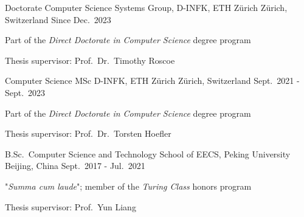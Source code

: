 

\begin{cventries}

  \cventry
    {Doctorate Computer Science} %
    {Systems Group, D-INFK, ETH Zürich} %
    {Zürich, Switzerland} %
    {Since Dec.\ 2023} %
    {
      \begin{cvitems} %
      \item {Part of the \emph{Direct Doctorate in Computer Science} degree program}
      \item {Thesis supervisor: Prof.\ Dr.\ Timothy Roscoe}
      \end{cvitems}
    }

  \cventry
    {Computer Science MSc} %
    {D-INFK, ETH Zürich} %
    {Zürich, Switzerland} %
    {Sept.\ 2021 - Sept.\ 2023} %
    {
      \begin{cvitems} %
      \item {Part of the \emph{Direct Doctorate in Computer Science} degree program}
      \item {Thesis supervisor: Prof.\ Dr.\ Torsten Hoefler}
      \end{cvitems}
    }

  \cventry
    {B.Sc.\ Computer Science and Technology} %
    {School of EECS, Peking University} %
    {Beijing, China} %
    {Sept.\ 2017 - Jul.\ 2021} %
    {
      \begin{cvitems} %
      \item {"\emph{Summa cum laude}"; member of the \emph{Turing Class} honors program}
      \item {Thesis supervisor: Prof.\ Yun Liang}
      \end{cvitems}
    }

\end{cventries}
